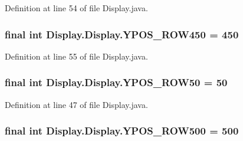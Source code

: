 Definition at line 54 of file Display.\+java.

\hypertarget{class_display_1_1_display_a68978a2870b55dbd8b5ab6d93db2ed79}{}
\subsubsection[{Y\+P\+O\+S\+\_\+\+R\+O\+W450}]{\setlength{\rightskip}{0pt plus 5cm}final int Display.\+Display.\+Y\+P\+O\+S\+\_\+\+R\+O\+W450 = 450\hspace{0.3cm}{\ttfamily [static]}}\label{class_display_1_1_display_a68978a2870b55dbd8b5ab6d93db2ed79}


Definition at line 55 of file Display.\+java.

\hypertarget{class_display_1_1_display_abfcff615e1843cea5f5f5236f7270469}{}
\subsubsection[{Y\+P\+O\+S\+\_\+\+R\+O\+W50}]{\setlength{\rightskip}{0pt plus 5cm}final int Display.\+Display.\+Y\+P\+O\+S\+\_\+\+R\+O\+W50 = 50\hspace{0.3cm}{\ttfamily [static]}}\label{class_display_1_1_display_abfcff615e1843cea5f5f5236f7270469}


Definition at line 47 of file Display.\+java.

\hypertarget{class_display_1_1_display_af69167585902297bf72bccb89eac59ad}{}
\subsubsection[{Y\+P\+O\+S\+\_\+\+R\+O\+W500}]{\setlength{\rightskip}{0pt plus 5cm}final int Display.\+Display.\+Y\+P\+O\+S\+\_\+\+R\+O\+W500 = 500\hspace{0.3cm}{\ttfamily [static]}}\label{class_display_1_1_display_af69167585902297bf72bccb89eac59ad}


